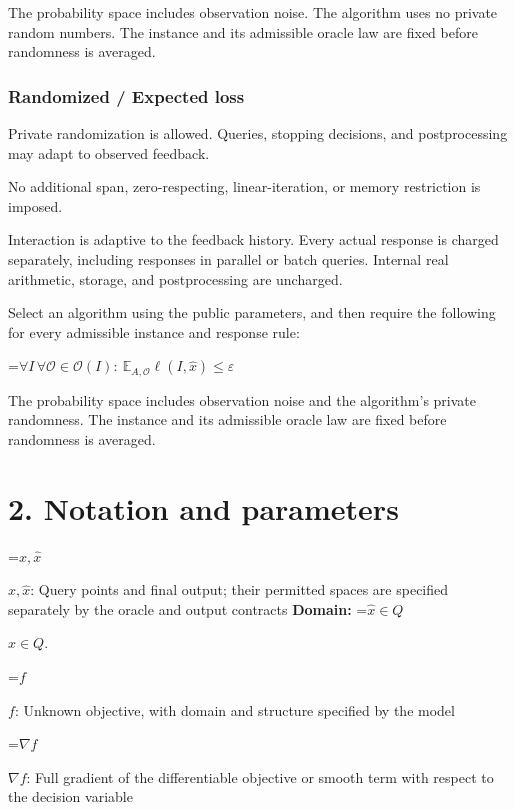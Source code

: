 \documentclass[10pt,a4paper]{article}
\newcommand{\AtlasMath}[1]{\par\begingroup\centering\setbox0=\hbox{$\displaystyle #1$}\ifdim\wd0>1.4\linewidth\typeout{ATLAS WIDE FORMULA: \the\wd0}\fi\ifdim\wd0>\linewidth\resizebox{\linewidth}{!}{\box0}\else\box0\fi\par\endgroup}
\newcommand{\AtlasInlineMath}[1]{\begingroup\setbox0=\hbox{$#1$}\ifdim\wd0>.4\linewidth\endgroup\AtlasMath{#1}\else\endgroup$#1$\fi}
\begin{document}
The probability space includes observation noise. The algorithm uses no private random numbers. The instance and its admissible oracle law are fixed before randomness is averaged.



\subsubsection{Randomized / Expected loss}


Private randomization is allowed. Queries, stopping decisions, and postprocessing may adapt to observed feedback.



No additional span, zero-respecting, linear-iteration, or memory restriction is imposed.



Interaction is adaptive to the feedback history. Every actual response is charged separately, including responses in parallel or batch queries. Internal real arithmetic, storage, and postprocessing are uncharged.



Select an algorithm using the public parameters, and then require the following for every admissible instance and response rule:




\AtlasMath{\forall I\,\forall\mathcal{O}\in\mathcal{O}(I):\ \mathbb{E}_{A,\mathcal{O}}\ell(I,\widehat{x})\le\varepsilon}




The probability space includes observation noise and the algorithm's private randomness. The instance and its admissible oracle law are fixed before randomness is averaged.



\section{2. Notation and parameters}


\AtlasInlineMath{x,\widehat{x}}: Query points and final output; their permitted spaces are specified separately by the oracle and output contracts \textbf{Domain:} \AtlasInlineMath{\widehat{x}\in Q}.



\AtlasInlineMath{f}: Unknown objective, with domain and structure specified by the model



\AtlasInlineMath{\nabla f}: Full gradient of the differentiable objective or smooth term with respect to the decision variable
\end{document}
